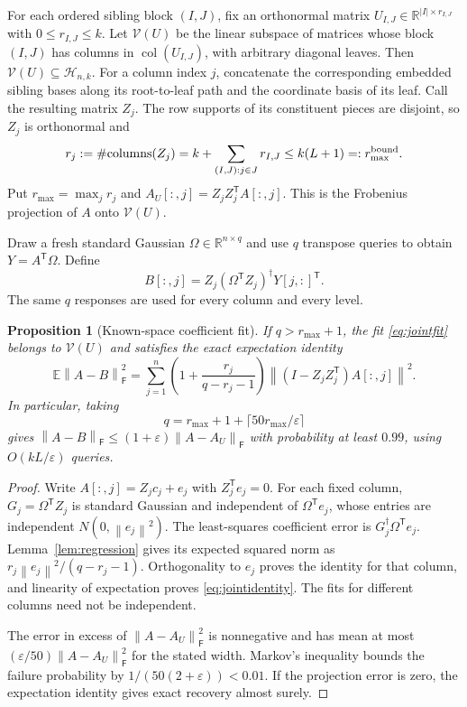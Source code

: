 \documentclass[11pt]{article}
\newtheorem{proposition}[theorem]{Proposition}
\theoremstyle{remark}
\newcommand{\R}{\mathbb R}
\newcommand{\E}{\mathbb E}
\newcommand{\F}{\mathsf F}
\newcommand{\Hclass}{\mathcal H_{n,k}}
\newcommand{\eps}{\varepsilon}
\newcommand{\norm}[1]{\left\lVert #1\right\rVert}
\DeclareMathOperator{\col}{col}
\begin{document}
For each ordered sibling block $(I,J)$, fix an orthonormal matrix
$U_{I,J}\in\R^{|I|\times r_{I,J}}$ with $0\le r_{I,J}\le k$.
Let $\mathcal V(U)$ be the linear subspace of matrices whose block $(I,J)$
has columns in $\col(U_{I,J})$, with arbitrary diagonal leaves.
Then $\mathcal V(U)\subseteq\Hclass$.
For a column index $j$, concatenate the corresponding embedded sibling
bases along its root-to-leaf path and the coordinate basis of its leaf.
Call the resulting matrix $Z_j$. The row supports of its constituent pieces
are disjoint, so $Z_j$ is orthonormal and
\[
 r_j:=\#\text{columns}(Z_j)
   =k+\sum_{(I,J):j\in J}r_{I,J}\le k(L+1)=:r_{\max}^{\rm bound}.
\]
Put $r_{\max}=\max_jr_j$ and
$A_U[:,j]=Z_jZ_j^{\mathsf T}A[:,j]$.
This is the Frobenius projection of $A$ onto $\mathcal V(U)$.

Draw a fresh standard Gaussian $\Omega\in\R^{n\times q}$ and use $q$
transpose queries to obtain $Y=A^{\mathsf T}\Omega$. Define
\begin{equation}\label{eq:jointfit}
 B[:,j]=Z_j(\Omega^{\mathsf T}Z_j)^\dagger Y[j,:]^{\mathsf T}.
\end{equation}
The same $q$ responses are used for every column and every level.

\begin{proposition}[Known-space coefficient fit]\label{prop:jointfit}
If $q>r_{\max}+1$, the fit \eqref{eq:jointfit} belongs to $\mathcal V(U)$ and
satisfies the exact expectation identity
\begin{equation}\label{eq:jointidentity}
 \E\norm{A-B}_\F^2
 =\sum_{j=1}^n\left(1+\frac{r_j}{q-r_j-1}\right)
      \norm{(I-Z_jZ_j^{\mathsf T})A[:,j]}^2.
\end{equation}
In particular, taking
\[
 q=r_{\max}+1+\lceil50r_{\max}/\eps\rceil
\]
gives $\norm{A-B}_\F\le(1+\eps)\norm{A-A_U}_\F$ with probability at least
$0.99$, using $O(kL/\eps)$ queries.
\end{proposition}
\begin{proof}
Write $A[:,j]=Z_jc_j+e_j$ with $Z_j^{\mathsf T}e_j=0$.
For each fixed column, $G_j=\Omega^{\mathsf T}Z_j$ is standard Gaussian
and independent of $\Omega^{\mathsf T}e_j$, whose entries are independent
$N(0,\norm{e_j}^2)$. The least-squares coefficient error is
$G_j^\dagger\Omega^{\mathsf T}e_j$.
Lemma~\ref{lem:regression} gives its expected squared norm as
$r_j\norm{e_j}^2/(q-r_j-1)$. Orthogonality to $e_j$ proves the identity
for that column, and linearity of expectation proves \eqref{eq:jointidentity}.
The fits for different columns need not be independent.

The error in excess of $\norm{A-A_U}_\F^2$ is nonnegative and has mean at
most $(\eps/50)\norm{A-A_U}_\F^2$ for the stated width.
Markov's inequality bounds the failure probability by
$1/(50(2+\eps))<0.01$. If the projection error is zero, the expectation
identity gives exact recovery almost surely.
\end{proof}
\end{document}
